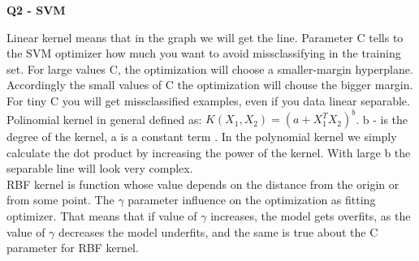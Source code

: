 \documentclass[12pt,a4paper]{article}
\begin{document}
\newpage
\begin{center}
	\textbf{Q2 - SVM}
\end{center}

Linear kernel means that in the graph we will get the line. Parameter C tells to the SVM optimizer how much you want to avoid missclassifying in the training set. For large values C, the optimization will choose a smaller-margin hyperplane. Accordingly the small values of C the optimization will chouse the bigger margin. For tiny C you will get missclassified examples, even if you data linear separable.\\
 Polinomial kernel in general defined as: $K(X_1,X_2) = (a+X_1^T X_2)^b$. b - is the degree of the kernel, a is a constant term \cite{svm}. In the polynomial kernel we simply calculate the dot product by increasing the power of the kernel. With large b the separable line will look very complex.\\
RBF kernel is function whose value depends on the distance from the origin or from some point. The $\gamma$ parameter influence on the optimization as fitting optimizer. That means that if value of $\gamma$  increases, the model gets overfits, as the value of $\gamma$  decreases the model underfits, and the same is true about the C parameter for RBF kernel.
\end{document}
